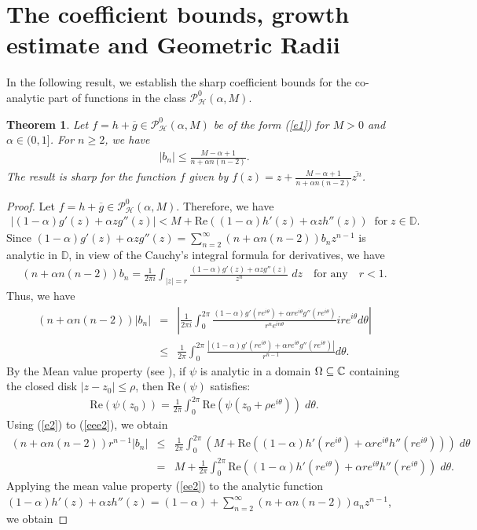 \documentclass[11pt,reqno]{amsart}
\newtheorem{theo}{Theorem}[section]
\newtheorem{open problem}{Open problem}[section]
\newcommand{\ol}{\overline}
\newcommand{\beas}{\begin{eqnarray*}}
\newcommand{\eeas}{\end{eqnarray*}}
\newcommand{\bea}{\begin{eqnarray}}
\newcommand{\eea}{\end{eqnarray}}
\numberwithin{equation}{section}
\begin{document}
\section{The coefficient bounds, growth estimate and Geometric Radii}
\noindent In the following result, we establish the sharp coefficient bounds for the co-analytic part of functions in the class $\mathcal{P}_{\mathcal{H}}^0(\alpha,M)$.
\begin{theo}\label{T2} Let $f=h+\ol{g}\in\mathcal{P}_{\mathcal{H}}^0(\alpha,M)$ be of the form (\ref{e1}) for $M>0$ and $\alpha\in(0,1]$. For $n\geq 2$, we have
\beas |b_n|\leq \frac{M-\alpha+1}{n+\alpha n(n-2)}.\eeas
The result is sharp for the function $f$ given by $f(z)=z+\frac{M-\alpha+1}{n+\alpha n(n-2)}\ol{z^n}$. \end{theo}
\begin{proof} Let $f=h+\ol{g}\in \mathcal{P}_{\mathcal{H}}^0(\alpha,M)$. Therefore, we have
\bea\label{e2} \left|(1-\alpha)g'(z)+\alpha zg''(z)\right|<M+\text{Re}\left((1-\alpha)h'(z)+\alpha zh''(z)\right)\;\;\text{for} \;z\in\mathbb{D}.\eea
Since $(1-\alpha)g'(z)+\alpha zg''(z)=\sum_{n=2}^\infty\left(n+\alpha n(n-2)\right)b_nz^{n-1}$ is analytic in $\mathbb{D}$, in view of the Cauchy's integral formula for derivatives, we have 
\beas \left(n+\alpha n(n-2)\right)b_n=\frac{1}{2\pi i}\int_{|z|=r}\frac{(1-\alpha)g'(z)+\alpha zg''(z)}{z^{n}}\;dz \quad \text{for any}\quad r<1.\eeas
Thus, we have
\bea\left(n+\alpha n(n-2)\right)|b_n|&=&\left|\frac{1}{2\pi i}\int_0^{2\pi}\frac{(1-\alpha)g'(re^{i\theta})+\alpha re^{i\theta}g''(re^{i\theta})}{r^{n}e^{in\theta}}ir e^{i\theta}d\theta\right|\nonumber\\[2mm]
\label{eee2}&\leq&\frac{1}{2\pi}\int_0^{2\pi}\frac{\left|(1-\alpha)g'(re^{i\theta})+\alpha re^{i\theta}g''(re^{i\theta})\right|}{r^{n-1}}d\theta.\eea
By the Mean value property (see \cite{P2005, D2004}), if $\psi$ is analytic in a domain $\Omega\subseteq \Bbb{C}$ containing the closed disk $|z-z_0|\leq \rho$, then $\text{Re}(\psi)$ satisfies:
\bea\label{ee2} \text{Re}(\psi(z_0))=\frac{1}{2\pi}\int_0^{2\pi} \text{Re}(\psi(z_0+\rho e^{i\theta}))\;d\theta.\eea
Using (\ref{e2}) to (\ref{eee2}), we obtain
\beas\left(n+\alpha n(n-2)\right) r^{n-1}|b_n|&\leq&\frac{1}{2\pi}\int_0^{2\pi}\left(M+\text{Re}\left((1-\alpha)h'(re^{i\theta})+\alpha re^{i\theta}h''(re^{i\theta})\right)\right)\;d\theta\\[2mm]
&=&M+\frac{1}{2\pi}\int_0^{2\pi}\text{Re}\left((1-\alpha)h'(re^{i\theta})+\alpha re^{i\theta}h''(re^{i\theta})\right)\;d\theta.\eeas
Applying the mean value property (\ref{ee2}) to the analytic function $(1-\alpha)h'(z)+\alpha zh''(z)=(1-\alpha)+\sum_{n=2}^\infty (n+\alpha n(n-2))a_n z^{n-1}$, we obtain

\end{proof}
\end{document}

